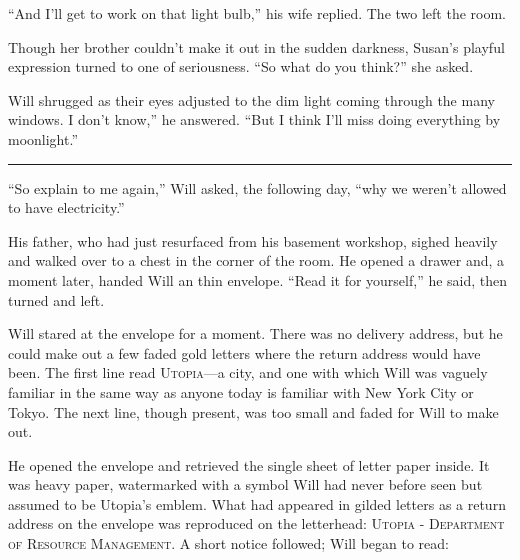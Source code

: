 \documentclass[12pt,letterpaper,oneside,english]{book}
\begin{document}
``And I'll get to work on that light bulb,'' his wife replied.
The two left the room.

Though her brother couldn't make it out in the sudden darkness, Susan's
playful expression turned to one of seriousness. ``So what do you
think?'' she asked.

Will shrugged as their eyes adjusted to the dim light coming through
the many windows. I don't know,'' he answered. ``But I think I'll
miss doing everything by moonlight.''

\medskip
{\centering\rule{\linewidth}{1pt}}
\smallskip

``So explain to me again,'' Will asked, the following day, ``why
we weren't allowed to have electricity.''

His father, who had just resurfaced from his basement workshop, sighed
heavily and walked over to a chest in the corner of the room. He opened
a drawer and, a moment later, handed Will an thin envelope. ``Read
it for yourself,'' he said, then turned and left.

Will stared at the envelope for a moment. There was no delivery address,
but he could make out a few faded gold letters where the return address
would have been. The first line read \textsc{Utopia}---a city, and one
with which Will was vaguely familiar in the same way as anyone today
is familiar with New York City or Tokyo. The next line, though present,
was too small and faded for Will to make out.

He opened the envelope and retrieved the single sheet of letter paper
inside. It was heavy paper, watermarked with a symbol Will had never
before seen but assumed to be Utopia's emblem. What had appeared in
gilded letters as a return address on the envelope was reproduced
on the letterhead: \textsc{Utopia - Department of Resource Management}.
A short notice followed; Will began to read:

\medskip
{}
\medskip
\end{document}
